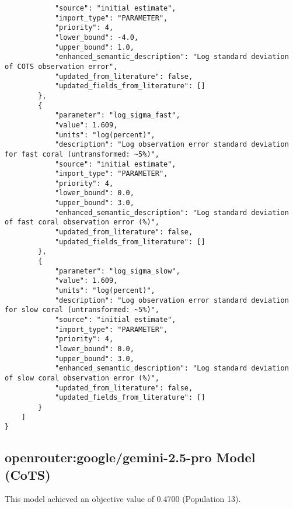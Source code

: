 \begin{lstlisting}
            "source": "initial estimate",
            "import_type": "PARAMETER",
            "priority": 4,
            "lower_bound": -4.0,
            "upper_bound": 1.0,
            "enhanced_semantic_description": "Log standard deviation of COTS observation error",
            "updated_from_literature": false,
            "updated_fields_from_literature": []
        },
        {
            "parameter": "log_sigma_fast",
            "value": 1.609,
            "units": "log(percent)",
            "description": "Log observation error standard deviation for fast coral (untransformed: ~5%)",
            "source": "initial estimate",
            "import_type": "PARAMETER",
            "priority": 4,
            "lower_bound": 0.0,
            "upper_bound": 3.0,
            "enhanced_semantic_description": "Log standard deviation of fast coral observation error (%)",
            "updated_from_literature": false,
            "updated_fields_from_literature": []
        },
        {
            "parameter": "log_sigma_slow",
            "value": 1.609,
            "units": "log(percent)",
            "description": "Log observation error standard deviation for slow coral (untransformed: ~5%)",
            "source": "initial estimate",
            "import_type": "PARAMETER",
            "priority": 4,
            "lower_bound": 0.0,
            "upper_bound": 3.0,
            "enhanced_semantic_description": "Log standard deviation of slow coral observation error (%)",
            "updated_from_literature": false,
            "updated_fields_from_literature": []
        }
    ]
}
\end{lstlisting}
\clearpage
\subsection{openrouter:google/gemini-2.5-pro Model (CoTS)}
This model achieved an objective value of 0.4700 (Population 13).

